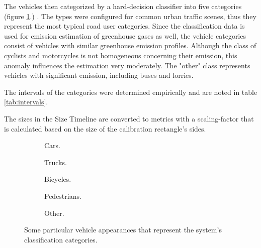 The vehicles then categorized by a hard-decision classifier into five categories (figure \ref{fig:types}.) .
The types were configured for common urban traffic scenes, thus they represent the most typical road user categories.
Since the classification data is used for emission estimation of greenhouse gases as well, the vehicle categories consist of vehicles with similar greenhouse emission profiles.
Although the class of cyclists and motorcycles is not homogeneous concerning their emission, this anomaly influences the estimation very moderately.
The "other" class represents vehicles with significant emission, including buses and lorries. 

The intervals of the categories were determined empirically and are noted in table \ref{tab:intervals}.

The sizes in the Size Timeline are converted to metrics with a scaling-factor that is calculated based on the size of the calibration rectangle's sides.

\begin{figure}[!t]
	\centering
	\begin{adjustbox}{minipage=\linewidth,scale=0.75}
	\begin{subfigure}[b]{0.25\textwidth}
	
	\caption{Cars.}
	\end{subfigure}
	\quad
	\begin{subfigure}[b]{0.25\textwidth}
	
	\caption{Trucks.}
	\end{subfigure}
	\quad
	\begin{subfigure}[b]{0.21\textwidth}
	
	\caption{Bicycles.}
	\end{subfigure}
	\hfill
	\begin{subfigure}[b]{0.3\textwidth}
	
	\caption{Pedestrians.}
	\end{subfigure}
	\qquad
	\begin{subfigure}[b]{0.5\textwidth}
	
	\caption{Other.}
	\end{subfigure}

	\caption{Some particular vehicle appearances that represent the system's classification categories.\label{fig:types}}
    \end{adjustbox}
\end{figure}



